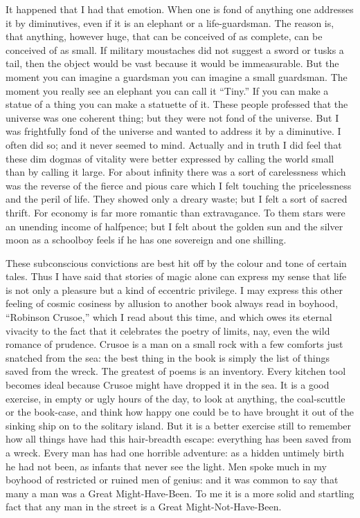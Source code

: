 It happened that I had that emotion. When one is fond of anything one addresses it by diminutives, even if it is an elephant or a life-guardsman. The reason is, that anything, however huge, that can be conceived of as complete, can be conceived of as small. If military moustaches did not suggest a sword or tusks a tail, then the object would be vast because it would be immeasurable. But the moment you can imagine a guardsman you can imagine a small guardsman. The moment you really see an elephant you can call it “Tiny.” If you can make a statue of a thing you can make a statuette of it. These people professed that the universe was one coherent thing; but they were not fond of the universe. But I was frightfully fond of the universe and wanted to address it by a diminutive. I often did so; and it never seemed to mind. Actually and in truth I did feel that these dim dogmas of vitality were better expressed by calling the world small than by calling it large. For about infinity there was a sort of carelessness which was the reverse of the fierce and pious care which I felt touching the pricelessness and the peril of life. They showed only a dreary waste; but I felt a sort of sacred thrift. For economy is far more romantic than extravagance. To them stars were an unending income of halfpence; but I felt about the golden sun and the silver moon as a schoolboy feels if he has one sovereign and one shilling.

These subconscious convictions are best hit off by the colour and tone of certain tales. Thus I have said that stories of magic alone can express my sense that life is not only a pleasure but a kind of eccentric privilege. I may express this other feeling of cosmic cosiness by allusion to another book always read in boyhood, “Robinson Crusoe,” which I read about this time, and which owes its eternal vivacity to the fact that it celebrates the poetry of limits, nay, even the wild romance of prudence. Crusoe is a man on a small rock with a few comforts just snatched from the sea: the best thing in the book is simply the list of things saved from the wreck. The greatest of poems is an inventory. Every kitchen tool becomes ideal because Crusoe might have dropped it in the sea. It is a good exercise, in empty or ugly hours of the day, to look at anything, the coal-scuttle or the book-case, and think how happy one could be to have brought it out of the sinking ship on to the solitary island. But it is a better exercise still to remember how all things have had this hair-breadth escape: everything has been saved from a wreck. Every man has had one horrible adventure: as a hidden untimely birth he had not been, as infants that never see the light. Men spoke much in my boyhood of restricted or ruined men of genius: and it was common to say that many a man was a Great Might-Have-Been. To me it is a more solid and startling fact that any man in the street is a Great Might-Not-Have-Been.

